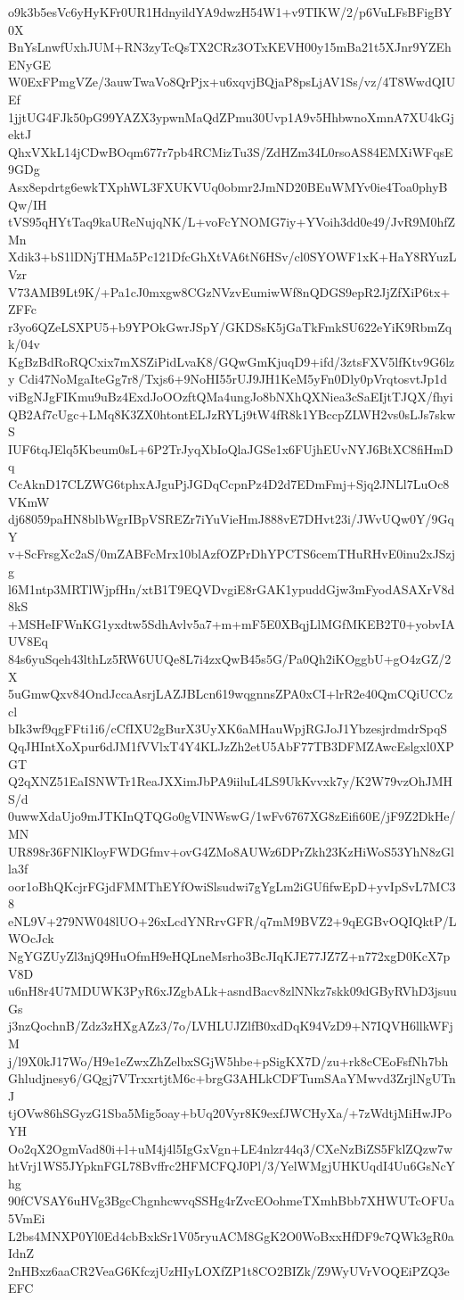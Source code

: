o9k3b5esVc6yHyKFr0UR1HdnyildYA9dwzH54W1+v9TIKW/2/p6VuLFsBFigBY0X
BnYsLnwfUxhJUM+RN3zyTcQsTX2CRz3OTxKEVH00y15mBa21t5XJnr9YZEhENyGE
W0ExFPmgVZe/3auwTwaVo8QrPjx+u6xqvjBQjaP8psLjAV1Ss/vz/4T8WwdQIUEf
1jjtUG4FJk50pG99YAZX3ypwnMaQdZPmu30Uvp1A9v5HhbwnoXmnA7XU4kGjektJ
QhxVXkL14jCDwBOqm677r7pb4RCMizTu3S/ZdHZm34L0rsoAS84EMXiWFqsE9GDg
Asx8epdrtg6ewkTXphWL3FXUKVUq0obmr2JmND20BEuWMYv0ie4Toa0phyBQw/IH
tVS95qHYtTaq9kaUReNujqNK/L+voFcYNOMG7iy+YVoih3dd0e49/JvR9M0hfZMn
Xdik3+bS1lDNjTHMa5Pc121DfcGhXtVA6tN6HSv/cl0SYOWF1xK+HaY8RYuzLVzr
V73AMB9Lt9K/+Pa1cJ0mxgw8CGzNVzvEumiwWf8nQDGS9epR2JjZfXiP6tx+ZFFc
r3yo6QZeLSXPU5+b9YPOkGwrJSpY/GKDSsK5jGaTkFmkSU622eYiK9RbmZqk/04v
KgBzBdRoRQCxix7mXSZiPidLvaK8/GQwGmKjuqD9+ifd/3ztsFXV5lfKtv9G6lzy
Cdi47NoMgaIteGg7r8/Txjs6+9NoHI55rUJ9JH1KeM5yFn0Dly0pVrqtosvtJp1d
viBgNJgFIKmu9uBz4ExdJoOOzftQMa4ungJo8bNXhQXNiea3cSaEIjtTJQX/fhyi
QB2Af7cUgc+LMq8K3ZX0htontELJzRYLj9tW4fR8k1YBccpZLWH2vs0sLJs7skwS
IUF6tqJElq5Kbeum0sL+6P2TrJyqXbIoQlaJGSe1x6FUjhEUvNYJ6BtXC8fiHmDq
CcAknD17CLZWG6tphxAJguPjJGDqCcpnPz4D2d7EDmFmj+Sjq2JNLl7LuOc8VKmW
dj68059paHN8blbWgrIBpVSREZr7iYuVieHmJ888vE7DHvt23i/JWvUQw0Y/9GqY
v+ScFrsgXc2aS/0mZABFcMrx10blAzfOZPrDhYPCTS6cemTHuRHvE0inu2xJSzjg
l6M1ntp3MRTlWjpfHn/xtB1T9EQVDvgiE8rGAK1ypuddGjw3mFyodASAXrV8d8kS
+MSHeIFWnKG1yxdtw5SdhAvlv5a7+m+mF5E0XBqjLlMGfMKEB2T0+yobvIAUV8Eq
84s6yuSqeh43lthLz5RW6UUQe8L7i4zxQwB45s5G/Pa0Qh2iKOggbU+gO4zGZ/2X
5uGmwQxv84OndJccaAsrjLAZJBLcn619wqgnnsZPA0xCI+lrR2e40QmCQiUCCzcl
bIk3wf9qgFFti1i6/cCfIXU2gBurX3UyXK6aMHauWpjRGJoJ1YbzesjrdmdrSpqS
QqJHIntXoXpur6dJM1fVVlxT4Y4KLJzZh2etU5AbF77TB3DFMZAwcEslgxl0XPGT
Q2qXNZ51EaISNWTr1ReaJXXimJbPA9iiluL4LS9UkKvvxk7y/K2W79vzOhJMHS/d
0uwwXdaUjo9mJTKInQTQGo0gVINWswG/1wFv6767XG8zEifi60E/jF9Z2DkHe/MN
UR898r36FNlKloyFWDGfmv+ovG4ZMo8AUWz6DPrZkh23KzHiWoS53YhN8zGlla3f
oor1oBhQKcjrFGjdFMMThEYfOwiSlsudwi7gYgLm2iGUfifwEpD+yvIpSvL7MC38
eNL9V+279NW048lUO+26xLcdYNRrvGFR/q7mM9BVZ2+9qEGBvOQIQktP/LWOcJck
NgYGZUyZl3njQ9HuOfmH9eHQLneMsrho3BcJIqKJE77JZ7Z+n772xgD0KcX7pV8D
u6nH8r4U7MDUWK3PyR6xJZgbALk+asndBacv8zlNNkz7skk09dGByRVhD3jsuuGs
j3nzQochnB/Zdz3zHXgAZz3/7o/LVHLUJZlfB0xdDqK94VzD9+N7IQVH6llkWFjM
j/l9X0kJ17Wo/H9e1eZwxZhZelbxSGjW5hbe+pSigKX7D/zu+rk8cCEoFsfNh7bh
Ghludjnesy6/GQgj7VTrxxrtjtM6c+brgG3AHLkCDFTumSAaYMwvd3ZrjlNgUTnJ
tjOVw86hSGyzG1Sba5Mig5oay+bUq20Vyr8K9exfJWCHyXa/+7zWdtjMiHwJPoYH
Oo2qX2OgmVad80i+l+uM4j4l5IgGxVgn+LE4nlzr44q3/CXeNzBiZS5FklZQzw7w
htVrj1WS5JYpknFGL78Bvffrc2HFMCFQJ0Pl/3/YelWMgjUHKUqdI4Uu6GsNcYhg
90fCVSAY6uHVg3BgcChgnhcwvqSSHg4rZvcEOohmeTXmhBbb7XHWUTcOFUa5VmEi
L2bs4MNXP0Yl0Ed4cbBxkSr1V05ryuACM8GgK2O0WoBxxHfDF9c7QWk3gR0aIdnZ
2nHBxz6aaCR2VeaG6KfczjUzHIyLOXfZP1t8CO2BIZk/Z9WyUVrVOQEiPZQ3eEFC
